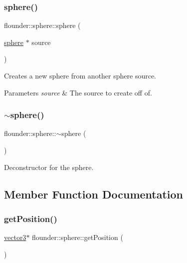 \subsubsection{\texorpdfstring{sphere()}{sphere()}\hspace{0.1cm}{\footnotesize\ttfamily [4/4]}}
{\footnotesize\ttfamily flounder\+::sphere\+::sphere (\begin{DoxyParamCaption}\item[{\hyperlink{classflounder_1_1sphere}{sphere} $\ast$}]{source }\end{DoxyParamCaption})}



Creates a new sphere from another sphere source. 


\begin{DoxyParams}{Parameters}
{\em source} & The source to create off of. \\
\hline
\end{DoxyParams}
\mbox{\label{classflounder_1_1sphere_ab6f5bcdd6c9f36e582aab2e267b1abcf}} 
\subsubsection{\texorpdfstring{$\sim$sphere()}{~sphere()}}
{\footnotesize\ttfamily flounder\+::sphere\+::$\sim$sphere (\begin{DoxyParamCaption}{ }\end{DoxyParamCaption})}



Deconstructor for the sphere. 



\subsection{Member Function Documentation}
\mbox{\label{classflounder_1_1sphere_a78dced6f9f51ced09303f21c2a5805ee}} 
\subsubsection{\texorpdfstring{get\+Position()}{getPosition()}}
{\footnotesize\ttfamily \hyperlink{classflounder_1_1vector3}{vector3}$\ast$ flounder\+::sphere\+::get\+Position (\begin{DoxyParamCaption}{ }\end{DoxyParamCaption})\hspace{0.3cm}{\ttfamily [inline]}}




